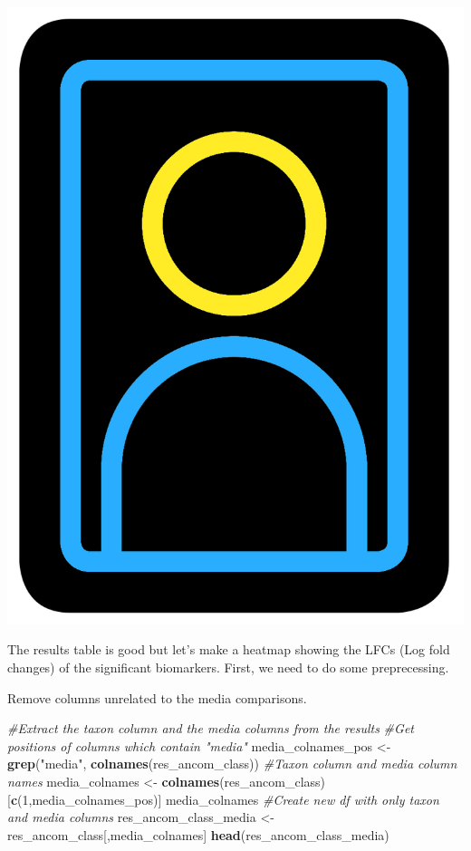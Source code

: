 \documentclass[
]{book}
\newenvironment{Shaded}{\begin{snugshade}}{\end{snugshade}}
\newcommand{\CommentTok}[1]{\textcolor[rgb]{0.56,0.35,0.01}{\textit{#1}}}
\newcommand{\DecValTok}[1]{\textcolor[rgb]{0.00,0.00,0.81}{#1}}
\newcommand{\FunctionTok}[1]{\textcolor[rgb]{0.13,0.29,0.53}{\textbf{#1}}}
\newcommand{\NormalTok}[1]{#1}
\newcommand{\OtherTok}[1]{\textcolor[rgb]{0.56,0.35,0.01}{#1}}
\newcommand{\StringTok}[1]{\textcolor[rgb]{0.31,0.60,0.02}{#1}}
\begin{document}
\includegraphics{figures/portrait.png}

The results table is good but let's make a heatmap showing the LFCs (Log fold changes) of the significant biomarkers. First, we need to do some preprecessing.

Remove columns unrelated to the media comparisons.

\begin{Shaded}
\begin{Highlighting}[]
\CommentTok{\#Extract the taxon column and the media columns from the results}
\CommentTok{\#Get positions of columns which contain "media"}
\NormalTok{media\_colnames\_pos }\OtherTok{\textless{}{-}} \FunctionTok{grep}\NormalTok{(}\StringTok{"media"}\NormalTok{, }\FunctionTok{colnames}\NormalTok{(res\_ancom\_class))}
\CommentTok{\#Taxon column and media column names}
\NormalTok{media\_colnames }\OtherTok{\textless{}{-}} \FunctionTok{colnames}\NormalTok{(res\_ancom\_class)[}\FunctionTok{c}\NormalTok{(}\DecValTok{1}\NormalTok{,media\_colnames\_pos)]}
\NormalTok{media\_colnames}
\CommentTok{\#Create new df with only taxon and media columns}
\NormalTok{res\_ancom\_class\_media }\OtherTok{\textless{}{-}}\NormalTok{ res\_ancom\_class[,media\_colnames]}
\FunctionTok{head}\NormalTok{(res\_ancom\_class\_media)}
\end{Highlighting}
\end{Shaded}
\end{document}

